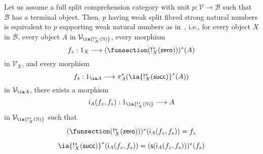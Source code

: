 {
\renewcommand{\thetheorem}{\ref{prop:equivalenceofnaturalnumbersinthesisandpaper}}
\begin{proposition}
Let us assume a full split comprehension category with unit \linebreak $p : \mathcal{V} \longrightarrow \mathcal{B}$ such that $\mathcal{B}$ has a terminal object. Then, $p$ having weak split fibred strong natural numbers is equivalent to $p$ supporting weak natural numbers as in~\cite{Ahman:FibredEffects}, i.e., for every object $X$ in $\mathcal{B}$, every object $A$ in $\mathcal{V}_{\ia {!_X^*(\mathbb{N})}}$, every morphism 
\[
f_z : 1_X \longrightarrow (\funsection(!_X^*(\mathsf{zero})))^*(A)
\]
in $\mathcal{V}_X$, and every morphism 
\[
f_s : 1_{\ia A} \longrightarrow \pi_A^*(\ia {!_X^*(\mathsf{succ})}^* (A))
\]
in $\mathcal{V}_{\ia A}$, there exists a morphism 
\[
\mathsf{i}_A(f_z,f_s) : 1_{\ia {!^*_X(\mathbb{N})}} \longrightarrow A
\]
in $\mathcal{V}_{\ia {!^*_X(\mathbb{N})}}$ such that 
\[
\begin{array}{c}
(\funsection(!_X^*(\mathsf{zero})))^*(\mathsf{i}_A(f_z,f_s)) = f_z
\\[3mm]
\ia {!_X^*(\mathsf{succ})}^* (\mathsf{i}_A(f_z,f_s)) 
=
(\mathsf{s}(\mathsf{i}_A(f_z,f_s)))^*(f_s) 
\end{array}
\vspace{0.2cm}
\]
\end{proposition}
\addtocounter{theorem}{-1}
}

\pagebreak

